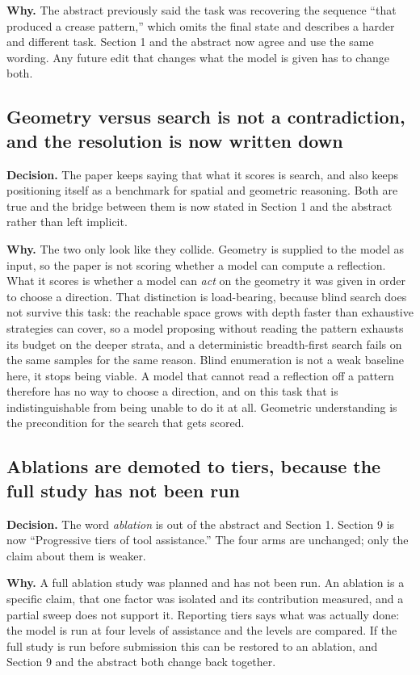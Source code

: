 \textbf{Why.} The abstract previously said the task was recovering the sequence ``that produced a
crease pattern,'' which omits the final state and describes a harder and different task. Section 1
and the abstract now agree and use the same wording. Any future edit that changes what the model is
given has to change both.

\subsection{Geometry versus search is not a contradiction, and the resolution is now written down}

\textbf{Decision.} The paper keeps saying that what it scores is search, and also keeps positioning
itself as a benchmark for spatial and geometric reasoning. Both are true and the bridge between
them is now stated in Section 1 and the abstract rather than left implicit.

\textbf{Why.} The two only look like they collide. Geometry is supplied to the model as input, so
the paper is not scoring whether a model can compute a reflection. What it scores is whether a
model can \emph{act} on the geometry it was given in order to choose a direction. That distinction
is load-bearing, because blind search does not survive this task: the reachable space grows with
depth faster than exhaustive strategies can cover, so a model proposing without reading the pattern
exhausts its budget on the deeper strata, and a deterministic breadth-first search fails on the
same samples for the same reason. Blind enumeration is not a weak baseline here, it stops being
viable. A model that cannot read a reflection off a pattern therefore has no way to choose a
direction, and on this task that is indistinguishable from being unable to do it at all. Geometric
understanding is the precondition for the search that gets scored.

\subsection{Ablations are demoted to tiers, because the full study has not been run}

\textbf{Decision.} The word \emph{ablation} is out of the abstract and Section 1. Section 9 is now
``Progressive tiers of tool assistance.'' The four arms are unchanged; only the claim about them is
weaker.

\textbf{Why.} A full ablation study was planned and has not been run. An ablation is a specific
claim, that one factor was isolated and its contribution measured, and a partial sweep does not
support it. Reporting tiers says what was actually done: the model is run at four levels of
assistance and the levels are compared. If the full study is run before submission this can be
restored to an ablation, and Section 9 and the abstract both change back together.

